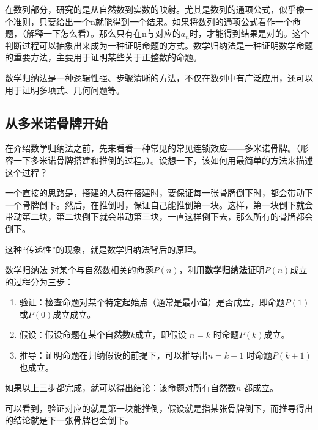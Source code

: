 
\begin{issues}
\issueDraft
\end{issues}



在数列部分，研究的是从自然数到实数的映射。尤其是数列的通项公式，似乎像一个准则，只要给出一个n就能得到一个结果。如果将数列的通项公式看作一个命题，（解释一下怎么看）。那么只有在n与对应的$a_n$时，才能得到结果是对的。这个判断过程可以抽象出来成为一种证明命题的方式。数学归纳法是一种证明数学命题的重要方法，主要用于证明某些关于正整数的命题。

数学归纳法是一种逻辑性强、步骤清晰的方法，不仅在数列中有广泛应用，还可以用于证明多项式、几何问题等。

\subsection{从多米诺骨牌开始}

在介绍数学归纳法之前，先来看看一种常见的常见连锁效应——多米诺骨牌。（形容一下多米诺骨牌搭建和推倒的过程。）。设想一下，该如何用最简单的方法来描述这个过程？

一个直接的思路是，搭建的人员在搭建时，要保证每一张骨牌倒下时，都会带动下一个骨牌倒下。然后，在推倒时，保证自己能推倒第一块。这样，第一块倒下就会带动第二块，第二块倒下就会带动第三块，一直这样倒下去，那么所有的骨牌都会倒下。

这种“传递性”的现象，就是数学归纳法背后的原理。

\begin{definition}{数学归纳法}
对某个与自然数相关的命题$P(n)$，利用\textbf{数学归纳法}证明$P(n)$成立的过程分为三步：
\begin{enumerate}
\item 验证：检查命题对某个特定起始点（通常是最小值）是否成立，即命题$P(1)$或$P(0)$成立成立。
\item 假设：假设命题在某个自然数$k$成立，即假设 $n = k$ 时命题$P(k)$成立。
\item 推导：证明命题在归纳假设的前提下，可以推导出$n = k+1$ 时命题$P(k+1)$也成立。
\end{enumerate}
如果以上三步都完成，就可以得出结论：该命题对所有自然数$n$ 都成立。
\end{definition}

可以看到，验证对应的就是第一块能推倒，假设就是指某张骨牌倒下，而推导得出的结论就是下一张骨牌也会倒下。

